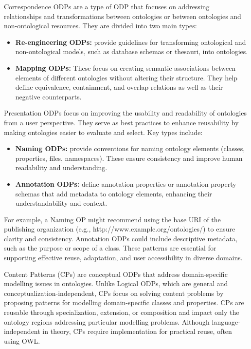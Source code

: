 Correspondence ODPs are a type of ODP that focuses on addressing relationships and transformations between ontologies or between ontologies and non-ontological resources.
They are divided into two main types:
\begin{itemize}
    \item \textbf{Re-engineering ODPs:} provide guidelines for transforming ontological and non-ontological models, such as database schemas or thesauri, into ontologies. 

    \item \textbf{Mapping ODPs:} These focus on creating semantic associations between elements of different ontologies without altering their structure. They help define equivalence, containment, and overlap relations as well as their negative counterparts.
\end{itemize}

Presentation ODPs focus on improving the usability and readability of ontologies from a user perspective.
They serve as best practices to enhance reusability by making ontologies easier to evaluate and select.
Key types include:
\begin{itemize}
    \item \textbf{Naming ODPs:} provide conventions for naming ontology elements (classes, properties, files, namespaces). These ensure consistency and improve human readability and understanding.

    \item \textbf{Annotation ODPs:} define annotation properties or annotation property schemas that add metadata to ontology elements, enhancing their understandability and context.
\end{itemize}
For example, a Naming OP might recommend using the base URI of the publishing organization (e.g., http://www.example.org/ontologies/) to ensure clarity and consistency.
Annotation ODPs could include descriptive metadata, such as the purpose or scope of a class.
These patterns are essential for supporting effective reuse, adaptation, and user accessibility in diverse domains.

Content Patterns (CPs) are conceptual ODPs that address domain-specific modelling issues in ontologies.
Unlike Logical ODPs, which are general and conceptualization-independent, CPs focus on solving content problems by proposing patterns for modelling domain-specific classes and properties.
CPs are reusable through specialization, extension, or composition and impact only the ontology regions addressing particular modelling problems.
Although language-independent in theory, CPs require implementation for practical reuse, often using OWL.

